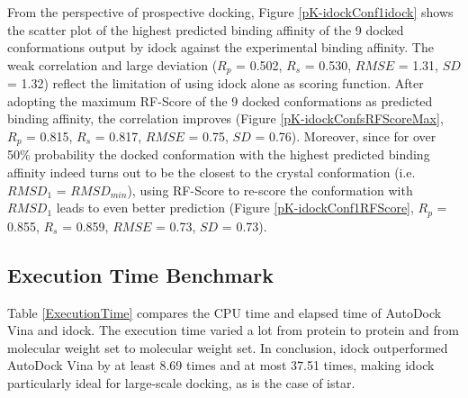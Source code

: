 \documentclass[10pt]{article}
\begin{document}
From the perspective of prospective docking, Figure \ref{pK-idockConf1idock} shows the scatter plot of the highest predicted binding affinity of the 9 docked conformations output by idock against the experimental binding affinity. The weak correlation and large deviation ($R_p$ = 0.502, $R_s$ = 0.530, $RMSE$ = 1.31, $SD$ = 1.32) reflect the limitation of using idock alone as scoring function. After adopting the maximum RF-Score of the 9 docked conformations as predicted binding affinity, the correlation improves (Figure \ref{pK-idockConfsRFScoreMax}, $R_p$ = 0.815, $R_s$ = 0.817, $RMSE$ = 0.75, $SD$ = 0.76). Moreover, since for over 50\% probability the docked conformation with the highest predicted binding affinity indeed turns out to be the closest to the crystal conformation (i.e. $RMSD_1$ = $RMSD_{min}$), using RF-Score to re-score the conformation with $RMSD_1$ leads to even better prediction (Figure \ref{pK-idockConf1RFScore}, $R_p$ = 0.855, $R_s$ = 0.859, $RMSE$ = 0.73, $SD$ = 0.73).%

\subsection*{Execution Time Benchmark}
Table \ref{ExecutionTime} compares the CPU time and elapsed time of AutoDock Vina and idock. The execution time varied a lot from protein to protein and from molecular weight set to molecular weight set. In conclusion, idock outperformed AutoDock Vina by at least 8.69 times and at most 37.51 times, making idock particularly ideal for large-scale docking, as is the case of istar.

\end{document}

